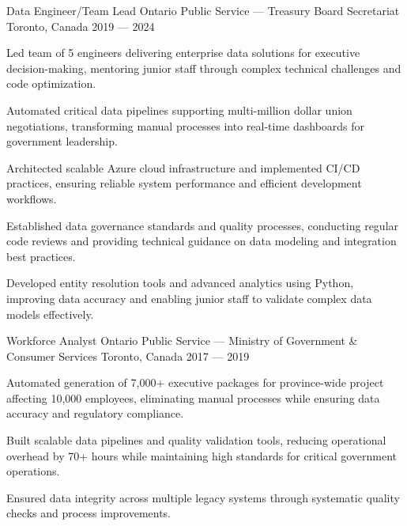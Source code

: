 \begin{cventries}
 \cventry%
 {Data Engineer/Team Lead}
 {Ontario Public Service --- Treasury Board Secretariat}
 {Toronto, Canada}
 {2019 --- 2024}
 {
    \begin{cvitems}
        \item Led team of 5 engineers delivering enterprise data solutions for executive decision-making, mentoring junior staff through complex technical challenges and code optimization.
        \item Automated critical data pipelines supporting multi-million dollar union negotiations, transforming manual processes into real-time dashboards for government leadership.
        \item Architected scalable Azure cloud infrastructure and implemented CI/CD practices, ensuring reliable system performance and efficient development workflows.
        \item Established data governance standards and quality processes, conducting regular code reviews and providing technical guidance on data modeling and integration best practices.
        \item Developed entity resolution tools and advanced analytics using Python, improving data accuracy and enabling junior staff to validate complex data models effectively.
    \end{cvitems}
 }

\cventry%
	{Workforce Analyst}
	{Ontario Public Service --- Ministry of Government \& Consumer Services}
	{Toronto, Canada}
	{2017 --- 2019}
	{
		\begin{cvitems}
			\item Automated generation of 7,000+ executive packages for province-wide project affecting 10,000 employees, eliminating manual processes while ensuring data accuracy and regulatory compliance.
			\item Built scalable data pipelines and quality validation tools, reducing operational overhead by 70+ hours while maintaining high standards for critical government operations.
			\item Ensured data integrity across multiple legacy systems through systematic quality checks and process improvements.
		\end{cvitems}
	}

\end{cventries}